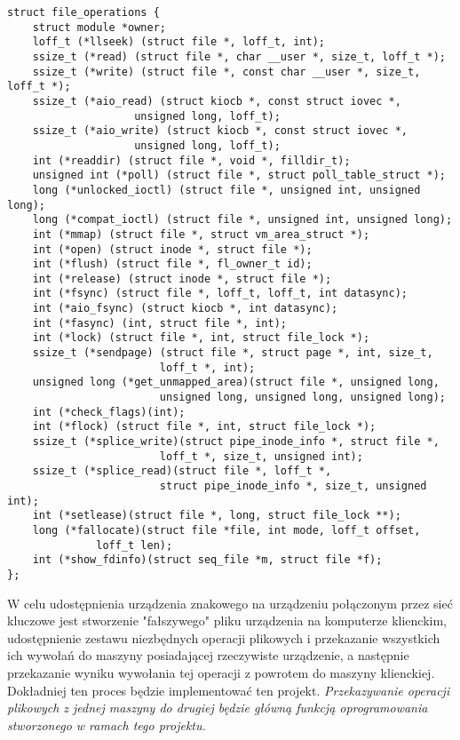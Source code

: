 \documentclass[10pt]{scrartcl}
\begin{document}
\newpage
\begin{verbatim}
struct file_operations {
    struct module *owner;
    loff_t (*llseek) (struct file *, loff_t, int);
    ssize_t (*read) (struct file *, char __user *, size_t, loff_t *);
    ssize_t (*write) (struct file *, const char __user *, size_t, loff_t *);
    ssize_t (*aio_read) (struct kiocb *, const struct iovec *,
                    unsigned long, loff_t);
    ssize_t (*aio_write) (struct kiocb *, const struct iovec *,
                    unsigned long, loff_t);
    int (*readdir) (struct file *, void *, filldir_t);
    unsigned int (*poll) (struct file *, struct poll_table_struct *);
    long (*unlocked_ioctl) (struct file *, unsigned int, unsigned long);
    long (*compat_ioctl) (struct file *, unsigned int, unsigned long);
    int (*mmap) (struct file *, struct vm_area_struct *);
    int (*open) (struct inode *, struct file *);
    int (*flush) (struct file *, fl_owner_t id);
    int (*release) (struct inode *, struct file *);
    int (*fsync) (struct file *, loff_t, loff_t, int datasync);
    int (*aio_fsync) (struct kiocb *, int datasync);
    int (*fasync) (int, struct file *, int);
    int (*lock) (struct file *, int, struct file_lock *);
    ssize_t (*sendpage) (struct file *, struct page *, int, size_t,
                        loff_t *, int);
    unsigned long (*get_unmapped_area)(struct file *, unsigned long,
                        unsigned long, unsigned long, unsigned long);
    int (*check_flags)(int);
    int (*flock) (struct file *, int, struct file_lock *);
    ssize_t (*splice_write)(struct pipe_inode_info *, struct file *,
                        loff_t *, size_t, unsigned int);
    ssize_t (*splice_read)(struct file *, loff_t *,
                        struct pipe_inode_info *, size_t, unsigned int);
    int (*setlease)(struct file *, long, struct file_lock **);
    long (*fallocate)(struct file *file, int mode, loff_t offset,
              loff_t len);
    int (*show_fdinfo)(struct seq_file *m, struct file *f);
};
\end{verbatim}

W celu udostępnienia urządzenia znakowego na urządzeniu połączonym przez sieć kluczowe jest stworzenie "fałszywego" pliku urządzenia na komputerze klienckim, udostępnienie zestawu niezbędnych operacji plikowych i przekazanie wszystkich ich wywołań do maszyny posiadającej rzeczywiste urządzenie, a następnie przekazanie wyniku wywołania tej operacji z powrotem do maszyny klienckiej. Dokładniej ten proces będzie implementować ten projekt. \emph{Przekazywanie operacji plikowych z jednej maszyny do drugiej będzie główną funkcją oprogramowania stworzonego w ramach tego projektu.}
\end{document}
